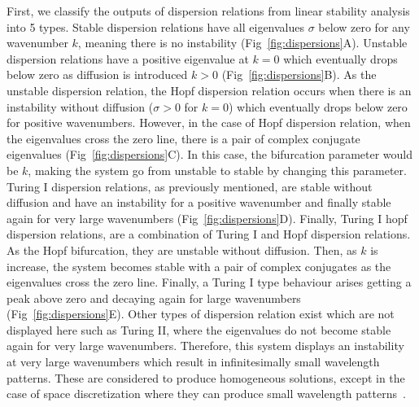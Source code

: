 First, we classify the outputs of dispersion relations from linear stability analysis into 5 types.
Stable dispersion relations have all eigenvalues $\sigma$ below zero for any wavenumber $k$, meaning there is no instability (Fig~\ref{fig:dispersions}A).
Unstable dispersion relations have a positive eigenvalue at $k=0$ which eventually drops below zero as diffusion is introduced $k>0$ (Fig~\ref{fig:dispersions}B).
As the unstable dispersion relation, the Hopf dispersion relation occurs when there is an instability without diffusion ($\sigma>0$ for $k=0$) which eventually drops below zero for positive wavenumbers.
However, in the case of Hopf dispersion relation, when the eigenvalues cross the zero line, there is a pair of complex conjugate eigenvalues (Fig~\ref{fig:dispersions}C).
In this case, the bifurcation parameter would be $k$, making the system go from unstable to stable by changing this parameter.
Turing I dispersion relations, as previously mentioned, are stable without diffusion and have an instability for a positive wavenumber and finally stable again for very large wavenumbers (Fig~\ref{fig:dispersions}D).
Finally, Turing I hopf dispersion relations, are a combination of Turing I and Hopf dispersion relations.
As the Hopf bifurcation, they are unstable without diffusion.
Then, as $k$ is increase, the system becomes stable with a pair of complex conjugates as the eigenvalues cross the zero line.
Finally, a Turing I type behaviour arises getting a peak above zero and decaying again for large wavenumbers (Fig~\ref{fig:dispersions}E).
Other types of dispersion relation exist which are not displayed here such as Turing II, where the eigenvalues do not become stable again for very large wavenumbers.
Therefore, this system displays an instability at very large wavenumbers which result in infinitesimally small wavelength patterns.
These are considered to produce homogeneous solutions, except in the case of space discretization where they can produce small wavelength patterns~\parencite{Wang2022}.



